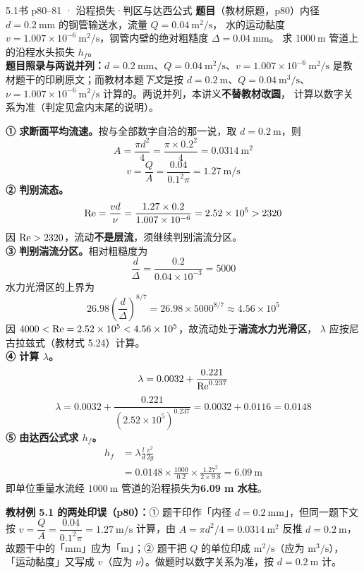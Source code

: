 \begin{liti}{5.1}{书 p80--81 · 沿程损失·判区与达西公式}
\textbf{题目}（教材原题，p80）内径 $d=0.2\ \mathrm{mm}$ 的钢管输送水，流量 $Q=0.04\ \mathrm{m^2/s}$，
水的运动黏度 $v=1.007\times10^{-6}\ \mathrm{m^2/s}$，钢管内壁的绝对粗糙度 $\Delta=0.04\ \mathrm{mm}$。
求 $1000\ \mathrm{m}$ 管道上的沿程水头损失 $h_f$。\\
\textbf{题目照录与两说并列：}$d=0.2\ \mathrm{mm}$、$Q=0.04\ \mathrm{m^2/s}$、$v=1.007\times10^{-6}\ \mathrm{m^2/s}$
是教材题干的印刷原文；而教材本题\emph{下文}是按 $d=0.2\ \mathrm{m}$、$Q=0.04\ \mathrm{m^3/s}$、
$\nu=1.007\times10^{-6}\ \mathrm{m^2/s}$ 计算的。两说并列，本讲义\textbf{不替教材改圆}，
计算以数字关系为准（判定见盒内末尾的说明）。

\begin{jie}
\textbf{① 求断面平均流速。}按与全部数字自洽的那一说，取 $d=0.2\ \mathrm{m}$，则
\[ A=\frac{\pi d^2}{4}=\frac{\pi\times0.2^2}{4}=0.0314\ \mathrm{m^2} \]
\[ v=\frac{Q}{A}=\frac{0.04}{0.1^2\pi}=1.27\ \mathrm{m/s} \]
\textbf{② 判别流态。}
\[ \mathrm{Re}=\frac{vd}{\nu}=\frac{1.27\times0.2}{1.007\times10^{-6}}=2.52\times10^5>2320 \]
因 $\mathrm{Re}>2320$，流动\textbf{不是层流}，须继续判别湍流分区。\\
\textbf{③ 判别湍流分区。}相对粗糙度为
\[ \frac{d}{\Delta}=\frac{0.2}{0.04\times10^{-3}}=5000 \]
水力光滑区的上界为
\[ 26.98\left(\frac{d}{\Delta}\right)^{8/7}=26.98\times5000^{8/7}\approx4.56\times10^5 \]
因 $4000<\mathrm{Re}=2.52\times10^5<4.56\times10^5$，故流动处于\textbf{湍流水力光滑区}，
$\lambda$ 应按尼古拉兹式（教材式 5.24）计算。\\
\textbf{④ 计算 $\lambda$。}
\[ \lambda=0.0032+\frac{0.221}{\mathrm{Re}^{0.237}} \]
\[ \lambda=0.0032+\frac{0.221}{\left(2.52\times10^5\right)^{0.237}}=0.0032+0.0116=0.0148 \]
\textbf{⑤ 由达西公式求 $h_f$。}
\[
\begin{aligned}
h_f&=\lambda\frac{l}{d}\frac{v^2}{2g}\\
   &=0.0148\times\frac{1000}{0.2}\times\frac{1.27^2}{2\times9.8}=6.09\ \mathrm{m}
\end{aligned}
\]
即单位重量水流经 $1000\ \mathrm{m}$ 管道的沿程损失为\textbf{6.09 m 水柱}。
\end{jie}

\begin{tishi}
\textbf{教材例 5.1 的两处印误（p80）：}① 题干印作「内径 $d=0.2\ \mathrm{mm}$」，但同一题下文按
$v=\dfrac{Q}{A}=\dfrac{0.04}{0.1^2\pi}=1.27\ \mathrm{m/s}$ 计算，由 $A=\pi d^2/4=0.0314\ \mathrm{m^2}$ 反推 $d=0.2\ \mathrm{m}$，
故题干中的「mm」应为「m」；② 题干把 $Q$ 的单位印成 $\mathrm{m^2/s}$（应为 $\mathrm{m^3/s}$），
「运动黏度」又写成 $v$（应为 $\nu$）。做题时以数字关系为准，按 $d=0.2\ \mathrm{m}$ 计。
\end{tishi}
\end{liti}

